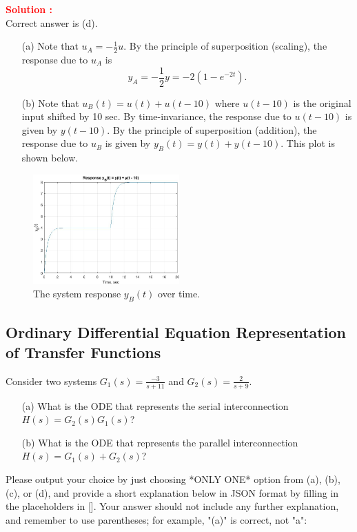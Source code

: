 \documentclass[12pt]{article}
\begin{document}
\textbf{\textcolor{red}{Solution :}} \\
Correct answer is (d).\\
\begin{enumerate}
    \item[(a)] Note that \(u_A = -\frac{1}{2}u\). By the principle of superposition (scaling), the response due to \(u_A\) is
    \[y_A = -\frac{1}{2}y = -2(1 - e^{-2t}).\]
    
    \item[(b)] Note that \(u_B(t) = u(t) + u(t - 10)\) where \(u(t - 10)\) is the original input shifted by 10 sec. By time-invariance, the response due to \(u(t - 10)\) is given by \(y(t - 10)\). By the principle of superposition (addition), the response due to \(u_B\) is given by \(y_B(t) = y(t) + y(t - 10)\). This plot is shown below.

\end{enumerate}


\begin{figure}[H]
    \centering
    \includegraphics[width=0.5\textwidth]{figs/1.4.jpg}
    \caption{The system response \(y_B(t)\) over time.}
    \label{fig:yb}
\end{figure}

\clearpage
\subsection{Ordinary Differential Equation Representation of Transfer Functions}

Consider two systems \(G_1(s) = \frac{-3}{s+11}\) and \(G_2(s) = \frac{2}{s+9}\).

\begin{enumerate}
    \item[(a)] What is the ODE that represents the serial interconnection \(H(s) = G_2(s)G_1(s)\)?

    \item[(b)] What is the ODE that represents the parallel interconnection \(H(s) = G_1(s) + G_2(s)\)?
\end{enumerate}
Please output your choice by just choosing *ONLY ONE* option from (a), (b), (c), or (d), and provide a short explanation below in JSON format by filling in the placeholders in []. Your answer should not include any further explanation, and remember to use parentheses; for example, "(a)" is correct, not "a":
\end{document}

